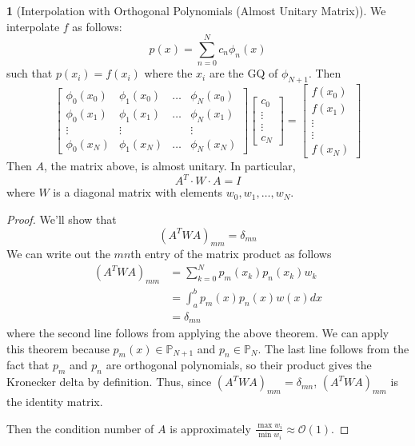\documentclass[12pt]{article}
\theoremstyle{definition}
\newtheorem{theorem}{\color{ForestGreen}{\textbf{Theorem}}}
\theoremstyle{definition}
\begin{document}
\begin{theorem}[Interpolation with Orthogonal Polynomials (Almost Unitary Matrix)]
We interpolate $f$ as follows:
\begin{equation}
	p(x) = \sum_{n=0}^N c_n \phi_n(x)
\end{equation}
such that $p(x_i) = f(x_i)$ where the $x_i$ are the GQ of $\phi_{N+1}$. Then
\begin{equation}
	\begin{bmatrix}
	\phi_0(x_0) & \phi_1(x_0) & \hdots & \phi_N(x_0) \\
	\phi_0(x_1) & \phi_1(x_1) & \hdots & \phi_N(x_1) \\
	\vdots & \vdots & & \vdots  \\
	\phi_0(x_N) & \phi_1(x_N) & \hdots & \phi_N(x_N)
	\end{bmatrix}
	\begin{bmatrix}
	c_0 \\ \vdots \\ \vdots \\ c_N
	\end{bmatrix}
	=
	\begin{bmatrix}
	f(x_0) \\ f(x_1) \\ \vdots \\ \vdots  \\ f(x_N)
	\end{bmatrix}
\end{equation}
Then $A$, the matrix above, is almost unitary. In particular,
\begin{equation}
	A^T \cdot W \cdot A = I
\end{equation}
where $W$ is a diagonal matrix with elements $w_0, w_1, \ldots, w_N$.
\end{theorem}
\begin{proof}
	We'll show that
	\begin{equation}
		(A^T W A)_{mm} = \delta_{mn}
	\end{equation}
	We can write out the $mn$th entry of the matrix product as follows
	\begin{align*}
		(A^T W A)_{mm} &= \sum_{k=0}^N p_m(x_k)p_n(x_k)w_k \\
		&= \int_a^b p_m(x)p_n(x) w(x) dx \\
		&= \delta_{mn}
	\end{align*}
	where the second line follows from applying the above theorem. We can apply this theorem because $p_m(x) \in \mathbb{P}_{N+1}$ and $p_n \in \mathbb{P}_{N}$. The last line follows from the fact that $p_m$ and $p_n$ are orthogonal polynomials, so their product gives the Kronecker delta by definition. Thus, since  $(A^T W A)_{mm} = \delta_{mn}$, $(A^T W A)_{mm} $ is the identity matrix. 

	Then the condition number of $A$ is approximately $\frac{\max w_i}{\min w_i} \approx \mathcal{O}(1)$.
\end{proof}
\end{document}
